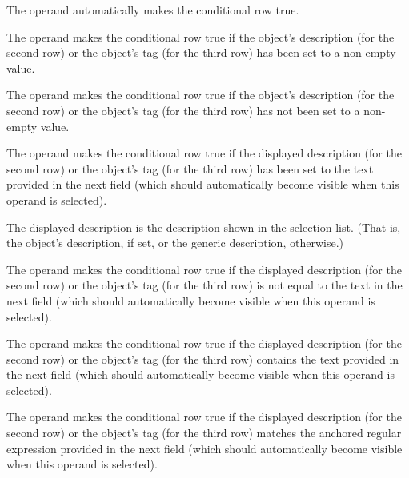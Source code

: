 The  operand
automatically makes the conditional row true.

The  operand makes the
conditional row
true if the object's description (for the second row) or the
object's tag (for the third row) has been set to a non-empty value.

The  operand makes the
conditional row
true if the object's description (for the second row) or the
object's tag (for the third row) has not been set to a non-empty value.

The  operand makes the
conditional row
true if the displayed description (for the second row) or the
object's tag (for the third row) has been set to the text provided
in the next field (which should automatically become visible when
this operand is selected).

The displayed description is the description shown in the selection
list. (That is, the object's description, if set, or the generic
description, otherwise.)

The  operand makes the
conditional row
true if the displayed description (for the second row) or the
object's tag (for the third row) is not equal to the text in the
next field (which should automatically become visible when
this operand is selected).

The  operand makes the
conditional row
true if the displayed description (for the second row) or the
object's tag (for the third row) contains the text provided
in the next field (which should automatically become visible when
this operand is selected).

The  operand makes the
conditional row
true if the displayed description (for the second row) or the
object's tag (for the third row) matches the anchored regular
expression provided in the next field (which should automatically
become visible when this operand is selected).


